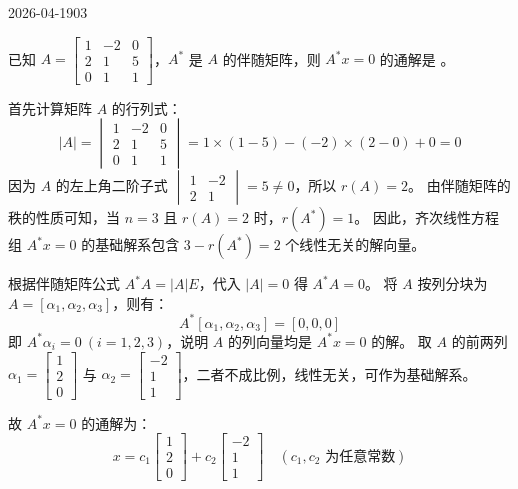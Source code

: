\begin{mistake}{2026-04-19}{03}

\begin{problemcontent}
已知 \(A = \begin{bmatrix} 1 & -2 & 0 \\ 2 & 1 & 5 \\ 0 & 1 & 1 \end{bmatrix}\)，\(A^*\) 是 \(A\) 的伴随矩阵，则 \(A^*x=0\) 的通解是 \underline{\hspace{2cm}}。
\end{problemcontent}

\begin{solutioncontent}
首先计算矩阵 \(A\) 的行列式：
\[
|A| = \begin{vmatrix} 1 & -2 & 0 \\ 2 & 1 & 5 \\ 0 & 1 & 1 \end{vmatrix} = 1 \times (1-5) - (-2) \times (2-0) + 0 = 0
\]
因为 \(A\) 的左上角二阶子式 \(\begin{vmatrix} 1 & -2 \\ 2 & 1 \end{vmatrix} = 5 \neq 0\)，所以 \(r(A) = 2\)。
由伴随矩阵的秩的性质可知，当 \(n=3\) 且 \(r(A) = 2\) 时，\(r(A^*) = 1\)。
因此，齐次线性方程组 \(A^*x=0\) 的基础解系包含 \(3 - r(A^*) = 2\) 个线性无关的解向量。

根据伴随矩阵公式 \(A^*A = |A|E\)，代入 \(|A|=0\) 得 \(A^*A = 0\)。
将 \(A\) 按列分块为 \(A = [\alpha_1, \alpha_2, \alpha_3]\)，则有：
\[
A^* [\alpha_1, \alpha_2, \alpha_3] = [0, 0, 0]
\]
即 \(A^*\alpha_i = 0\ (i=1,2,3)\)，说明 \(A\) 的列向量均是 \(A^*x=0\) 的解。
取 \(A\) 的前两列 \(\alpha_1 = \begin{bmatrix} 1 \\ 2 \\ 0 \end{bmatrix}\) 与 \(\alpha_2 = \begin{bmatrix} -2 \\ 1 \\ 1 \end{bmatrix}\)，二者不成比例，线性无关，可作为基础解系。

故 \(A^*x=0\) 的通解为：
\[
x = c_1 \begin{bmatrix} 1 \\ 2 \\ 0 \end{bmatrix} + c_2 \begin{bmatrix} -2 \\ 1 \\ 1 \end{bmatrix} \quad (c_1, c_2 \text{ 为任意常数})
\]
\end{solutioncontent}


\end{mistake}
